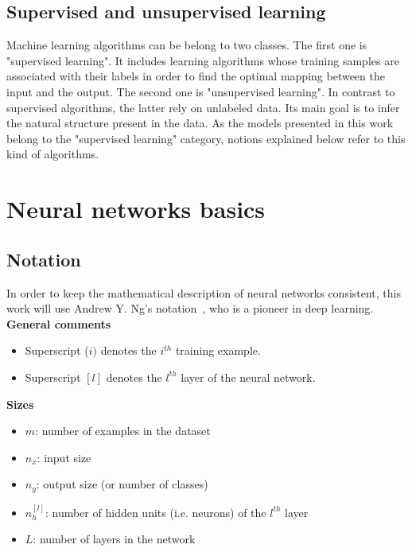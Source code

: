 \subsection{Supervised and unsupervised learning}

\setlength{\marginparwidth}{3cm}\leavevmode {}Machine learning algorithms can be belong to two classes. The first one is "supervised learning". It includes learning algorithms whose training samples are associated with their labels in order to find the optimal mapping between the input and the output. The second one is "unsupervised learning". In contrast to supervised algorithms, the latter rely on unlabeled data. Its main goal is to infer the natural structure  present in the data. As the models presented in this work belong to the "supervised learning" category, notions explained below refer to this kind of algorithms.


\section{Neural networks basics}

\subsection{Notation}

\setlength{\marginparwidth}{3cm}\leavevmode {}In order to keep the mathematical description of neural networks consistent, this work will use Andrew Y. Ng's notation~\cite{16}, who is a pioneer in deep learning.\\

\noindent \textbf{General comments}
\begin{itemize}
\item Superscript ($i)$ denotes the $i^{th}$ training example.
\item Superscript $[l]$ denotes the $l^{th}$ layer of the neural network.
\end{itemize}

\noindent \textbf{Sizes}
\begin{itemize}
\item $m$: number of examples in the dataset
\item $n_{x}$: input size
\item $n_{y}$: output size (or number of classes)
\item $n_{h}^{[l]}$: number of hidden units (i.e. neurons) of the $l^{th}$ layer
\item $L$: number of layers in the network
\end{itemize}

